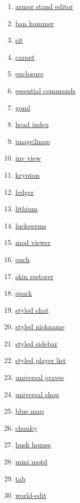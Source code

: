 \begin{enumerate}
    \item \href{https://modrinth.com/mod/armorstandeditor}{armor stand editor}
    \item \href{https://modrinth.com/mod/banhammer}{ban hammer}
    \item \href{https://modrinth.com/mod/bl4cks-sit}{sit}
    \item \href{https://modrinth.com/mod/carpet}{carpet}
    \item \href{https://modrinth.com/mod/enclosure}{enclosure}
    \item \href{https://modrinth.com/mod/essential-commands}{essential commands}
    \item \href{https://modrinth.com/mod/goml-reserved}{goml}
    \item \href{https://modrinth.com/mod/headindex}{head index}
    \item \href{https://modrinth.com/mod/image2map}{image2map}
    \item \href{https://modrinth.com/mod/invview}{inv view}
    \item \href{https://modrinth.com/mod/krypton}{krypton}
    \item \href{https://modrinth.com/mod/ledger}{ledger}
    \item \href{https://modrinth.com/mod/lithium}{lithium}
    \item \href{https://modrinth.com/mod/luckperms}{luckperms}
    \item \href{https://modrinth.com/mod/mod-viewer}{mod viewer}
    \item \href{https://modrinth.com/mod/ouch}{ouch}
    \item \href{https://modrinth.com/mod/skinrestorer}{skin restorer}
    \item \href{https://modrinth.com/mod/spark}{spark}
    \item \href{https://modrinth.com/mod/styled-chat}{styled chat}
    \item \href{https://modrinth.com/mod/styled-nicknames}{styled nickname}
    \item \href{https://modrinth.com/mod/styled-sidebars}{styled sidebar}
    \item \href{https://modrinth.com/mod/styledplayerlist}{styled player list}
    \item \href{https://modrinth.com/mod/universal-graves}{universal graves}
    \item \href{https://modrinth.com/mod/universal-shops}{universal shop}
    \item \href{https://modrinth.com/plugin/bluemap}{blue map}
    \item \href{https://modrinth.com/plugin/chunky}{chunky}
    \item \href{https://modrinth.com/plugin/huskhomes}{husk homes}
    \item \href{https://modrinth.com/plugin/minimotd}{mini motd}
    \item \href{https://modrinth.com/plugin/tab-was-taken}{tab}
    \item \href{https://modrinth.com/plugin/worldedit}{world-edit}
\end{enumerate}


